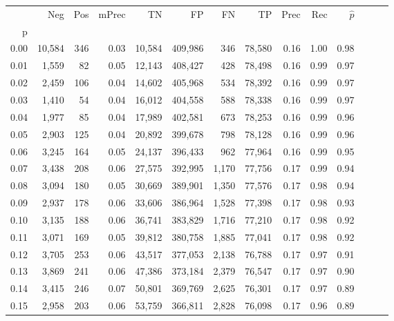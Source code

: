 \begin{tabular}{rrrrrrrrrrrrrr}
\toprule
{} &     Neg &    Pos & mPrec &       TN &       FP &      FN &      TP &  Prec &   Rec & $\hat{p}$ \\
p    &         &        &       &          &          &         &         &       &       &           \\
\midrule
0.00 &  10,584 &    346 &  0.03 &   10,584 &  409,986 &     346 &  78,580 &  0.16 &  1.00 &      0.98 \\
0.01 &   1,559 &     82 &  0.05 &   12,143 &  408,427 &     428 &  78,498 &  0.16 &  0.99 &      0.97 \\
0.02 &   2,459 &    106 &  0.04 &   14,602 &  405,968 &     534 &  78,392 &  0.16 &  0.99 &      0.97 \\
0.03 &   1,410 &     54 &  0.04 &   16,012 &  404,558 &     588 &  78,338 &  0.16 &  0.99 &      0.97 \\
0.04 &   1,977 &     85 &  0.04 &   17,989 &  402,581 &     673 &  78,253 &  0.16 &  0.99 &      0.96 \\
0.05 &   2,903 &    125 &  0.04 &   20,892 &  399,678 &     798 &  78,128 &  0.16 &  0.99 &      0.96 \\
0.06 &   3,245 &    164 &  0.05 &   24,137 &  396,433 &     962 &  77,964 &  0.16 &  0.99 &      0.95 \\
0.07 &   3,438 &    208 &  0.06 &   27,575 &  392,995 &   1,170 &  77,756 &  0.17 &  0.99 &      0.94 \\
0.08 &   3,094 &    180 &  0.05 &   30,669 &  389,901 &   1,350 &  77,576 &  0.17 &  0.98 &      0.94 \\
0.09 &   2,937 &    178 &  0.06 &   33,606 &  386,964 &   1,528 &  77,398 &  0.17 &  0.98 &      0.93 \\
0.10 &   3,135 &    188 &  0.06 &   36,741 &  383,829 &   1,716 &  77,210 &  0.17 &  0.98 &      0.92 \\
0.11 &   3,071 &    169 &  0.05 &   39,812 &  380,758 &   1,885 &  77,041 &  0.17 &  0.98 &      0.92 \\
0.12 &   3,705 &    253 &  0.06 &   43,517 &  377,053 &   2,138 &  76,788 &  0.17 &  0.97 &      0.91 \\
0.13 &   3,869 &    241 &  0.06 &   47,386 &  373,184 &   2,379 &  76,547 &  0.17 &  0.97 &      0.90 \\
0.14 &   3,415 &    246 &  0.07 &   50,801 &  369,769 &   2,625 &  76,301 &  0.17 &  0.97 &      0.89 \\
0.15 &   2,958 &    203 &  0.06 &   53,759 &  366,811 &   2,828 &  76,098 &  0.17 &  0.96 &      0.89 \\

\end{tabular}
